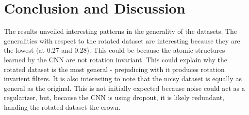 \documentclass[conference,compsoc]{IEEEtran}
\begin{document}
\section{Conclusion and Discussion}
%
The results unveiled interesting patterns in the generality of the datasets. The generalities with respect to the rotated dataset are interesting because they are the lowest (at 0.27 and 0.28). This could be because the atomic structures learned by the CNN are not rotation invariant. This could explain why the rotated dataset is the most general - prejudicing with it produces rotation invarient filters. It is also interesting to note that the noisy dataset is equally as general as the original. This is not initially expected because noise could act as a regularizer, but, because the CNN is using dropout, it is likely redundant, handing the rotated dataset the crown. 

\nocite{*}

%





  



\end{document}
